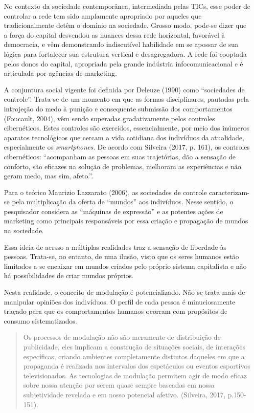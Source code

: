 No contexto da sociedade contemporânea, intermediada pelas TICs, esse
poder de controlar a rede tem sido amplamente apropriado por aqueles que
tradicionalmente detêm o domínio na sociedade. Grosso modo, pode-se
dizer que a força do capital desvendou as nuances dessa rede horizontal,
favorável à democracia, e vêm demonstrando indiscutível habilidade em se
apossar de sua lógica para fortalecer sua estrutura vertical e
desagregadora. A rede foi cooptada pelos donos do capital, apropriada
pela grande indústria infocomunicacional e é articulada por agências de
marketing.

A conjuntura social vigente foi definida por Deleuze (1990) como
``sociedades de controle''. Trata-se de um momento em que as formas
disciplinares, pautadas pela introjeção do medo à punição e consequente
submissão dos comportamentos (Foucault, 2004), vêm sendo superadas
gradativamente pelos controles cibernéticos. Estes controles são
exercidos, essencialmente, por meio dos inúmeros aparatos tecnológicos
que cercam a vida cotidiana dos indivíduos da atualidade, especialmente
os \emph{smartphones.} De acordo com Silveira (2017, p. 161), os
controles cibernéticos: ``acompanham as pessoas em suas trajetórias, dão
a sensação de conforto, são eficazes na solução de problemas, melhoram
as experiências e não geram medo, mas sim, afeto.''.

Para o teórico Maurizio Lazzarato (2006), as sociedades de controle
caracterizam-se pela multiplicação da oferta de ``mundos'' aos
indivíduos. Nesse sentido, o pesquisador considera as ``máquinas de
expressão'' e as potentes ações de marketing como principais
responsáveis por essa criação e propagação de mundos na sociedade.

Essa ideia de acesso a múltiplas realidades traz a sensação de liberdade
às pessoas. Trata-se, no entanto, de uma ilusão, visto que os seres
humanos estão limitados a se encaixar em mundos criados pelo próprio
sistema capitalista e não há possibilidades de criar mundos próprios.

Nesta realidade, o conceito de modulação é potencializado. Não se trata
mais de manipular opiniões dos indivíduos. O perfil de cada pessoa é
minuciosamente traçado para que os comportamentos humanos ocorram com
propósitos de consumo sistematizados.

\begin{quote}
Os processos de modulação não são meramente de distribuição de
publicidade, eles implicam a construção de situações sociais, de
interações específicas, criando ambientes completamente distintos
daqueles em que a propaganda é realizada nos intervalos dos espetáculos
ou eventos esportivos televisionados. As tecnologias de modulação
permitem agir de modo eficaz sobre nossa atenção por serem quase sempre
baseadas em nossa subjetividade revelada e em nosso potencial afetivo.
(Silveira, 2017, p.150-151).
\end{quote}

